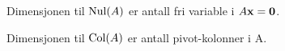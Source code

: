 Dimensjonen til $\text{Nul}(A)$ er antall fri variable i $A\mathbf{x} = \mathbf{0}$.

Dimensjonen til $\text{Col}(A)$ er antall pivot-kolonner i A.
